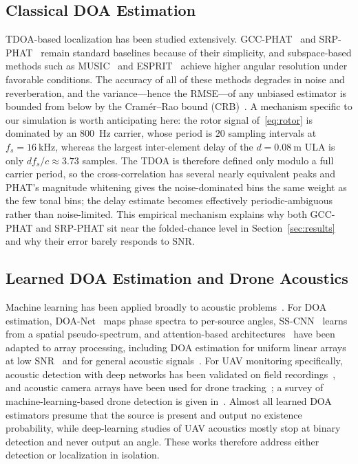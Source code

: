 \documentclass[sensors,article,submit,pdftex,moreauthors]{Definitions/mdpi}
\begin{document}
\subsection{Classical DOA Estimation}
TDOA-based localization has been studied extensively. GCC-PHAT~\cite{knapp1976gcc} and SRP-PHAT~\cite{dibiase2001srp} remain standard baselines because of their simplicity, and subspace-based methods such as MUSIC~\cite{schmidt1986music} and ESPRIT~\cite{roy1989esprit} achieve higher angular resolution under favorable conditions. The accuracy of all of these methods degrades in noise and reverberation, and the variance---hence the RMSE---of any unbiased estimator is bounded from below by the Cram\'er--Rao bound (CRB)~\cite{stoica1989music}. A mechanism specific to our simulation is worth anticipating here: the rotor signal of~\eqref{eq:rotor} is dominated by an \SI{800}{\hertz} carrier, whose period is $20$ sampling intervals at $f_s=\SI{16}{\kilo\hertz}$, whereas the largest inter-element delay of the $d=\SI{0.08}{\meter}$ ULA is only $df_s/c\approx3.73$ samples. The TDOA is therefore defined only modulo a full carrier period, so the cross-correlation has several nearly equivalent peaks and PHAT's magnitude whitening gives the noise-dominated bins the same weight as the few tonal bins; the delay estimate becomes effectively periodic-ambiguous rather than noise-limited. This empirical mechanism explains why both GCC-PHAT and SRP-PHAT sit near the folded-chance level in Section~\ref{sec:results} and why their error barely responds to SNR.

\subsection{Learned DOA Estimation and Drone Acoustics}
Machine learning has been applied broadly to acoustic problems~\cite{bianco2019ml}. For DOA estimation, DOA-Net~\cite{adavanne2018doa} maps phase spectra to per-source angles, SS-CNN~\cite{nguyen2020sscnn} learns from a spatial pseudo-spectrum, and attention-based architectures~\cite{vaswani2017attention} have been adapted to array processing, including DOA estimation for uniform linear arrays at low SNR~\cite{wang2024transformer} and for general acoustic signals~\cite{mack2022attention}. For UAV monitoring specifically, acoustic detection with deep networks has been validated on field recordings~\cite{jeon2017drone,kim2017uav}, and acoustic camera arrays have been used for drone tracking~\cite{busset2015acoustic}; a survey of machine-learning-based drone detection is given in~\cite{taha2019drone}. Almost all learned DOA estimators presume that the source is present and output no existence probability, while deep-learning studies of UAV acoustics mostly stop at binary detection and never output an angle. These works therefore address either detection or localization in isolation.
\end{document}

